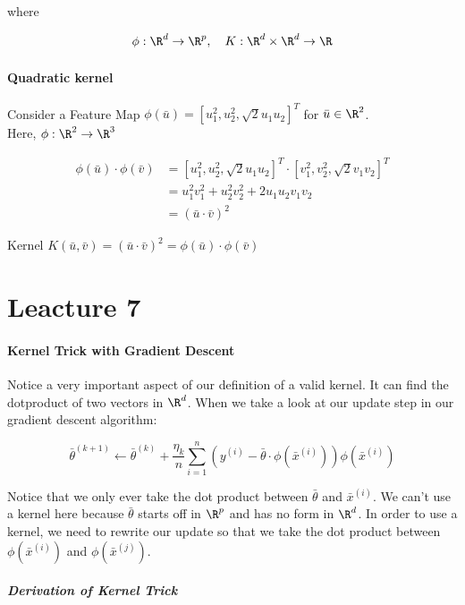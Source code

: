 \documentclass[12pt]{article}
\begin{document}
where

\[ \phi: \R^d \rightarrow \R^p, \quad K: \R^d \times \R^d \rightarrow \R\]

\subsection{Quadratic kernel}

Consider a Feature Map $\phi(\bar u) = [u_1^2, u_2^2, \sqrt 2 u_1u_2]^T$ for $\bar{u} \in \R^2$.\\
Here, $\phi: \R^2 \rightarrow \R^3$

\[ 
	\begin{aligned}
		\phi(\bar u) \cdot \phi(\bar v) &= [u_1^2, u_2^2, \sqrt 2 u_1u_2]^T \cdot [v_1^2, v_2^2, \sqrt 2 v_1v_2]^T\\
																		&= u_1^2v_1^2 + u_2^2v_2^2 + 2u_1u_2v_1v_2\\
																		&= (\bar u \cdot \bar v)^2
	\end{aligned}
\]

Kernel $K(\bar u, \bar v) = (\bar u \cdot \bar v)^2 = \phi(\bar u) \cdot \phi(\bar v)$

\part{Leacture 7}

\subsection{Kernel Trick with Gradient Descent}

Notice a very important aspect of our definition of a valid kernel. It can find the dotproduct of two vectors in $\R^d$. When we take a look at our update step in our gradient descent algorithm:

\[
	\bar{\theta}^{(k+1)} \gets \bar{\theta}^{(k)} + \frac {\eta_k} {n} \sum_{i=1}^n (y^{(i)} - \bar{\theta} \cdot \phi(\bar{x}^{(i)}))\phi(\bar{x}^{(i)})
\]

Notice that we only ever take the dot product between $\bar{\theta}$ and $\bar{x}^{(i)}$. We can't use a kernel here because $\bar{\theta}$ starts off in $\R^p$ and has no form in $\R^d$. In order to use a kernel, we need to rewrite our update so that we take the dot product between $\phi(\bar{x}^{(i)})$ and $\phi(\bar{x}^{(j)})$.

\subsubsection{Derivation of Kernel Trick}
\end{document}
